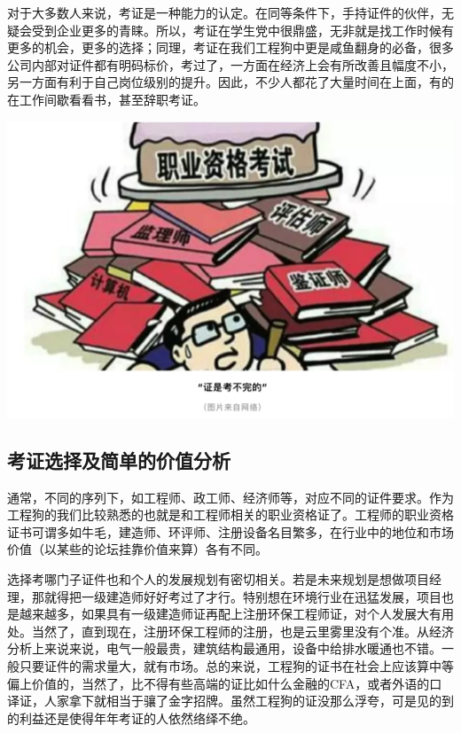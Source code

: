 \documentclass[]{book}
\begin{document}
对于大多数人来说，考证是一种能力的认定。在同等条件下，手持证件的伙伴，无疑会受到企业更多的青睐。所以，考证在学生党中很鼎盛，无非就是找工作时候有更多的机会，更多的选择；同理，考证在我们工程狗中更是咸鱼翻身的必备，很多公司内部对证件都有明码标价，考过了，一方面在经济上会有所改善且幅度不小，另一方面有利于自己岗位级别的提升。因此，不少人都花了大量时间在上面，有的在工作间歇看看书，甚至辞职考证。

\includegraphics[width=8.33in]{images/kaozheng1}

\hypertarget{ux8003ux8bc1ux9009ux62e9ux53caux7b80ux5355ux7684ux4ef7ux503cux5206ux6790}{%
\subsection{考证选择及简单的价值分析}\label{ux8003ux8bc1ux9009ux62e9ux53caux7b80ux5355ux7684ux4ef7ux503cux5206ux6790}}

通常，不同的序列下，如工程师、政工师、经济师等，对应不同的证件要求。作为工程狗的我们比较熟悉的也就是和工程师相关的职业资格证了。工程师的职业资格证书可谓多如牛毛，建造师、环评师、注册设备名目繁多，在行业中的地位和市场价值（以某些的论坛挂靠价值来算）各有不同。

选择考哪门子证件也和个人的发展规划有密切相关。若是未来规划是想做项目经理，那就得把一级建造师好好考过了才行。特别想在环境行业在迅猛发展，项目也是越来越多，如果具有一级建造师证再配上注册环保工程师证，对个人发展大有用处。当然了，直到现在，注册环保工程师的注册，也是云里雾里没有个准。从经济分析上来说来说，电气一般最贵，建筑结构最通用，设备中给排水暖通也不错。一般只要证件的需求量大，就有市场。总的来说，工程狗的证书在社会上应该算中等偏上价值的，当然了，比不得有些高端的证比如什么金融的CFA，或者外语的口译证，人家拿下就相当于骧了金字招牌。虽然工程狗的证没那么浮夸，可是见的到的利益还是使得年年考证的人依然络绎不绝。
\end{document}
